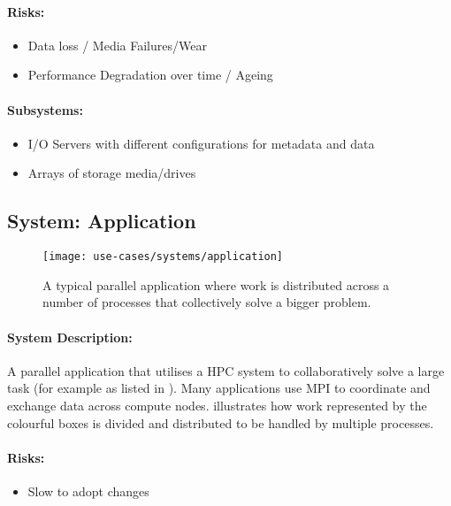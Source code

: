 \paragraph{Risks:}
\begin{itemize}
	\item Data loss / Media Failures/Wear
	\item Performance Degradation over time / Ageing
\end{itemize}


\paragraph{Subsystems:}

\begin{itemize}
	\item I/O Servers with different configurations for metadata and data
	\item Arrays of storage media/drives
\end{itemize}


\subsection{System: Application}
\label{System: Application}

\begin{figure}
	\centering
	\texttt{[image: use-cases/systems/application]}
	\caption{A typical parallel application where work is distributed across a number of processes that collectively solve a bigger problem.}
	\label{fig:System: Application}
\end{figure}

\paragraph{System Description:}
A parallel application that utilises a HPC system to collaboratively solve a large task (for example as listed in ).
Many applications use MPI to coordinate and exchange data across compute nodes.
 illustrates how work represented by the colourful boxes is divided and distributed to be handled by multiple processes.

\paragraph{Risks:}
\begin{itemize}
	\item Slow to adopt changes
\end{itemize}


